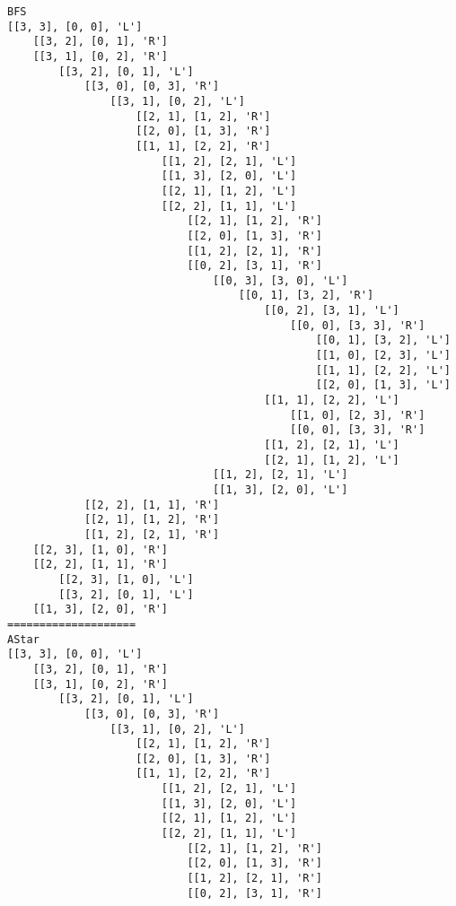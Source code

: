\documentclass{article}
\begin{document}
\begin{verbatim}
BFS
[[3, 3], [0, 0], 'L']
    [[3, 2], [0, 1], 'R']
    [[3, 1], [0, 2], 'R']
        [[3, 2], [0, 1], 'L']
            [[3, 0], [0, 3], 'R']
                [[3, 1], [0, 2], 'L']
                    [[2, 1], [1, 2], 'R']
                    [[2, 0], [1, 3], 'R']
                    [[1, 1], [2, 2], 'R']
                        [[1, 2], [2, 1], 'L']
                        [[1, 3], [2, 0], 'L']
                        [[2, 1], [1, 2], 'L']
                        [[2, 2], [1, 1], 'L']
                            [[2, 1], [1, 2], 'R']
                            [[2, 0], [1, 3], 'R']
                            [[1, 2], [2, 1], 'R']
                            [[0, 2], [3, 1], 'R']
                                [[0, 3], [3, 0], 'L']
                                    [[0, 1], [3, 2], 'R']
                                        [[0, 2], [3, 1], 'L']
                                            [[0, 0], [3, 3], 'R']
                                                [[0, 1], [3, 2], 'L']
                                                [[1, 0], [2, 3], 'L']
                                                [[1, 1], [2, 2], 'L']
                                                [[2, 0], [1, 3], 'L']
                                        [[1, 1], [2, 2], 'L']
                                            [[1, 0], [2, 3], 'R']
                                            [[0, 0], [3, 3], 'R']
                                        [[1, 2], [2, 1], 'L']
                                        [[2, 1], [1, 2], 'L']
                                [[1, 2], [2, 1], 'L']
                                [[1, 3], [2, 0], 'L']
            [[2, 2], [1, 1], 'R']
            [[2, 1], [1, 2], 'R']
            [[1, 2], [2, 1], 'R']
    [[2, 3], [1, 0], 'R']
    [[2, 2], [1, 1], 'R']
        [[2, 3], [1, 0], 'L']
        [[3, 2], [0, 1], 'L']
    [[1, 3], [2, 0], 'R']
====================
AStar
[[3, 3], [0, 0], 'L']
    [[3, 2], [0, 1], 'R']
    [[3, 1], [0, 2], 'R']
        [[3, 2], [0, 1], 'L']
            [[3, 0], [0, 3], 'R']
                [[3, 1], [0, 2], 'L']
                    [[2, 1], [1, 2], 'R']
                    [[2, 0], [1, 3], 'R']
                    [[1, 1], [2, 2], 'R']
                        [[1, 2], [2, 1], 'L']
                        [[1, 3], [2, 0], 'L']
                        [[2, 1], [1, 2], 'L']
                        [[2, 2], [1, 1], 'L']
                            [[2, 1], [1, 2], 'R']
                            [[2, 0], [1, 3], 'R']
                            [[1, 2], [2, 1], 'R']
                            [[0, 2], [3, 1], 'R']

\end{verbatim}
\end{document}
